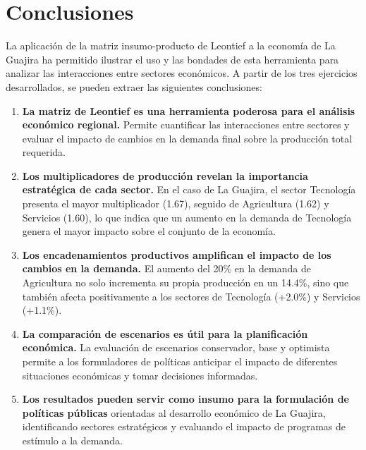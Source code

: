 \section{Conclusiones}

La aplicación de la matriz insumo-producto de Leontief a la economía de La Guajira ha permitido ilustrar el uso y las bondades de esta herramienta para analizar las interacciones entre sectores económicos. A partir de los tres ejercicios desarrollados, se pueden extraer las siguientes conclusiones:

\begin{enumerate}
    \item \textbf{La matriz de Leontief es una herramienta poderosa para el análisis económico regional.} Permite cuantificar las interacciones entre sectores y evaluar el impacto de cambios en la demanda final sobre la producción total requerida.

    \item \textbf{Los multiplicadores de producción revelan la importancia estratégica de cada sector.} En el caso de La Guajira, el sector Tecnología presenta el mayor multiplicador (1.67), seguido de Agricultura (1.62) y Servicios (1.60), lo que indica que un aumento en la demanda de Tecnología genera el mayor impacto sobre el conjunto de la economía.

    \item \textbf{Los encadenamientos productivos amplifican el impacto de los cambios en la demanda.} El aumento del 20\% en la demanda de Agricultura no solo incrementa su propia producción en un 14.4\%, sino que también afecta positivamente a los sectores de Tecnología (+2.0\%) y Servicios (+1.1\%).

    \item \textbf{La comparación de escenarios es útil para la planificación económica.} La evaluación de escenarios conservador, base y optimista permite a los formuladores de políticas anticipar el impacto de diferentes situaciones económicas y tomar decisiones informadas.

    \item \textbf{Los resultados pueden servir como insumo para la formulación de políticas públicas} orientadas al desarrollo económico de La Guajira, identificando sectores estratégicos y evaluando el impacto de programas de estímulo a la demanda.
\end{enumerate}

\clearpage
